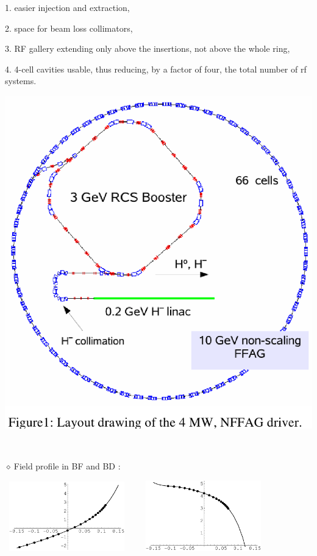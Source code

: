 \documentclass[12pt]{article}
\newcommand{\nid}{\noindent \ensuremath{\diamond~}}
\begin{document}
\begin{minipage}{1.\linewidth}
\begin{minipage}{.53\linewidth}
{\begin{minipage}{.99\linewidth}
\Large 

 1. easier injection and extraction,

 2. space for beam loss collimators,

 3. RF gallery extending only above the insertions, not above the whole ring,

 4. 4-cell cavities usable, thus reducing, by a factor of four, the
     total number of rf systems.
\end{minipage}
}

\end{minipage}
\begin{minipage}{.5\linewidth}

\vspace{-0ex}

 \begin{center}



 \includegraphics[width=.45\linewidth]{./figs_FFAG_introSlides/pumpletRing.eps}

~

\nid Field profile in  BF and BD : 

\mbox{
 \includegraphics[width=5cm]{./figs_FFAG_introSlides/bfField.eps}  ~ ~ \includegraphics[width=5cm]{./figs_FFAG_introSlides/BDField.eps}
}


\end{center}
\end{minipage}
\end{minipage}
\end{document}
